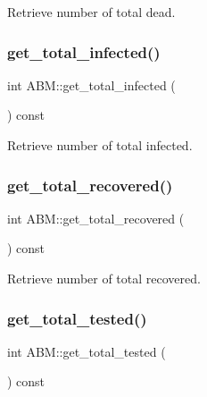 Retrieve number of total dead. 

\mbox{\label{classABM_ade59d69b32a0a57c0e0c1e48c95a7524}} 
\subsubsection{\texorpdfstring{get\+\_\+total\+\_\+infected()}{get\_total\_infected()}}
{\footnotesize\ttfamily int A\+B\+M\+::get\+\_\+total\+\_\+infected (\begin{DoxyParamCaption}{ }\end{DoxyParamCaption}) const\hspace{0.3cm}{\ttfamily [inline]}}



Retrieve number of total infected. 

\mbox{\label{classABM_a8fbf62a7df14f4ca34a69394d31834ed}} 
\subsubsection{\texorpdfstring{get\+\_\+total\+\_\+recovered()}{get\_total\_recovered()}}
{\footnotesize\ttfamily int A\+B\+M\+::get\+\_\+total\+\_\+recovered (\begin{DoxyParamCaption}{ }\end{DoxyParamCaption}) const\hspace{0.3cm}{\ttfamily [inline]}}



Retrieve number of total recovered. 

\mbox{\label{classABM_af04a4eb713648b9a938d5b773a0b0ff5}} 
\subsubsection{\texorpdfstring{get\+\_\+total\+\_\+tested()}{get\_total\_tested()}}
{\footnotesize\ttfamily int A\+B\+M\+::get\+\_\+total\+\_\+tested (\begin{DoxyParamCaption}{ }\end{DoxyParamCaption}) const\hspace{0.3cm}{\ttfamily [inline]}}

